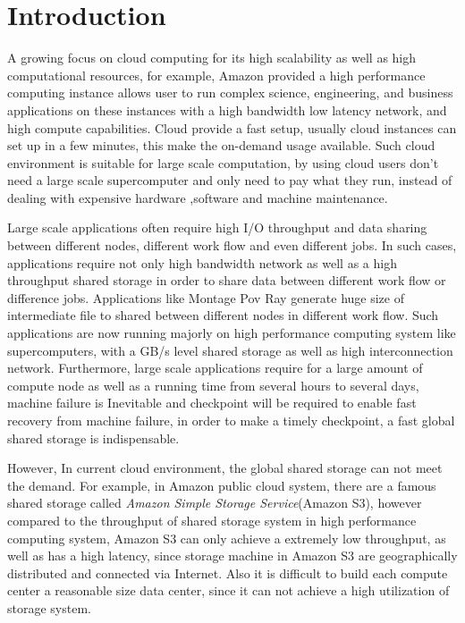 \section{Introduction}
\label{sec:introduction}
A growing focus on cloud computing for its high scalability as well as high computational
resources, for example, Amazon provided a high performance computing instance allows user to run
complex science, engineering, and business applications on these instances with a high bandwidth low latency
network, and high compute capabilities.
Cloud provide a fast setup, usually cloud instances can set up in a few minutes, this
make the on-demand usage available.
Such cloud environment is suitable for large scale
computation, by using cloud users don't need a large scale supercomputer and only need to pay
what they run, instead of dealing with expensive hardware ,software and machine maintenance.

Large scale applications often require high I/O
throughput and data sharing between different nodes, different work flow and even different jobs.
In such cases, applications require not only high bandwidth network as well as a high throughput
shared storage in order to share data between different work flow or difference jobs.
Applications like Montage Pov Ray generate huge size of intermediate file
to shared between different nodes in different work flow.
Such applications are now running majorly on high performance computing system like supercomputers, with a GB/s level shared storage as well as high interconnection network.
Furthermore, large scale applications require for a large amount of compute node as well as a
running time from several hours to several days, machine failure is Inevitable and checkpoint will be required to enable
fast recovery from machine failure\cite{checkpointing}, in order to make a timely checkpoint, a fast global
shared storage is indispensable.

However, In current cloud environment, the global shared storage can not meet the demand.
For example, in Amazon public cloud system, there are a famous shared storage called \emph{Amazon
Simple Storage Service}(Amazon S3), however compared to the throughput of shared storage system in
high performance computing system, Amazon S3 can only achieve a extremely low throughput, as well as has a high latency, since storage machine in Amazon S3 are geographically distributed and connected via Internet.
Also it is difficult to build each compute center a reasonable size data center, since it can not achieve a high utilization of storage system.

